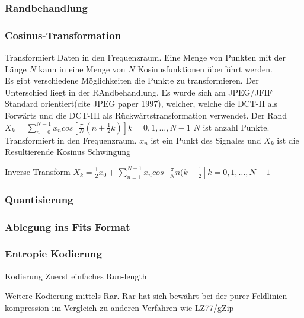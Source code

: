 \subsubsection{Randbehandlung} \label{konzept:loesung1:randbehandlung}

\subsubsection{Cosinus-Transformation} \label{konzept:loesung1:kosinus}
Transformiert Daten in den Frequenzraum. Eine Menge von Punkten mit der Länge $N$ kann in eine Menge von $N$ Kosinusfunktionen überführt werden.\\
Es gibt verschiedene Möglichkeiten die Punkte zu transformieren. Der Unterschied liegt in der RAndbehandlung. Es wurde sich am JPEG/JFIF Standard orientiert(cite JPEG paper 1997), welcher, welche die DCT-II als Forwärts und die DCT-III als Rückwärtstransformation verwendet.
Der Rand
$X_k = \sum_{n=0}^{N-1}x_n cos[\frac{\pi}{N}(n+\frac{1}{2}k)]
 k= 0,1,\ldots,N-1$
$N$ ist anzahl Punkte. Transformiert in den Frequenzraum. $x_n$ ist ein Punkt des Signales und $X_k$ ist die Resultierende Kosinus Schwingung%

Inverse Transform
$X_k = \frac{1}{2}x_0 + \sum_{n=1}^{N-1}x_n cos[\frac{\pi}{N}n(k+\frac{1}{2}]  k= 0,1,\ldots,N-1$

\subsubsection{Quantisierung}

\subsubsection{Ablegung ins Fits Format}

\subsubsection{Entropie Kodierung}\label{konzept:loesung1:kodierung}
Kodierung
	Zuerst einfaches Run-length

	Weitere Kodierung mittels Rar.
		Rar hat sich bewährt bei der purer Feldlinien kompression im Vergleich zu anderen Verfahren wie LZ77/gZip





